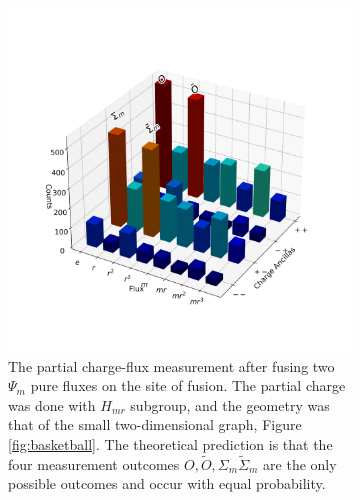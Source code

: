 \documentclass[a4paper,twocolumn,11pt, accepted=2024-06-14]{quantumarticle}
\begin{document}
\begin{figure}
\begin{subfigure}{0.47\textwidth}
    \label{fig:fusion_glass}
\end{subfigure}\hfill
\begin{subfigure}{0.47\textwidth}
    \includegraphics[width=\linewidth]{Figures/fusion_on_basketball.png}
    \caption{The partial charge-flux measurement after fusing two $\Psi_m$ pure fluxes on the site of fusion. The partial charge was done with $H_{mr}$ subgroup, and the geometry was that of the small two-dimensional graph, Figure \ref{fig:basketball}. The theoretical prediction is that the four measurement outcomes $O,\tilde O,\Sigma_m \tilde{\Sigma}_m$ are the only possible outcomes and occur with equal probability.}
    \label{fig:fusion_basketball}
\end{subfigure}
\vspace{15pt}
\begin{subfigure}{0.47\textwidth}

\end{subfigure}
\end{figure}
\end{document}
